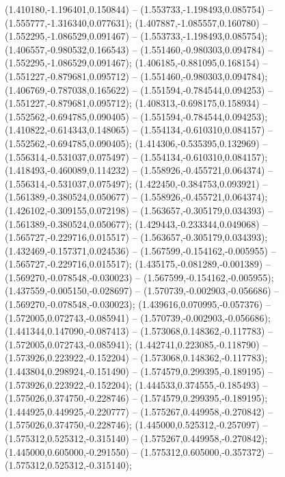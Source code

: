  (1.410180,-1.196401,0.150844) -- (1.553733,-1.198493,0.085754) -- (1.555777,-1.316340,0.077631);
 (1.407887,-1.085557,0.160780) -- (1.552295,-1.086529,0.091467) -- (1.553733,-1.198493,0.085754);
 (1.406557,-0.980532,0.166543) -- (1.551460,-0.980303,0.094784) -- (1.552295,-1.086529,0.091467);
 (1.406185,-0.881095,0.168154) -- (1.551227,-0.879681,0.095712) -- (1.551460,-0.980303,0.094784);
 (1.406769,-0.787038,0.165622) -- (1.551594,-0.784544,0.094253) -- (1.551227,-0.879681,0.095712);
 (1.408313,-0.698175,0.158934) -- (1.552562,-0.694785,0.090405) -- (1.551594,-0.784544,0.094253);
 (1.410822,-0.614343,0.148065) -- (1.554134,-0.610310,0.084157) -- (1.552562,-0.694785,0.090405);
 (1.414306,-0.535395,0.132969) -- (1.556314,-0.531037,0.075497) -- (1.554134,-0.610310,0.084157);
 (1.418493,-0.460089,0.114232) -- (1.558926,-0.455721,0.064374) -- (1.556314,-0.531037,0.075497);
 (1.422450,-0.384753,0.093921) -- (1.561389,-0.380524,0.050677) -- (1.558926,-0.455721,0.064374);
 (1.426102,-0.309155,0.072198) -- (1.563657,-0.305179,0.034393) -- (1.561389,-0.380524,0.050677);
 (1.429443,-0.233344,0.049068) -- (1.565727,-0.229716,0.015517) -- (1.563657,-0.305179,0.034393);
 (1.432469,-0.157371,0.024536) -- (1.567599,-0.154162,-0.005955) -- (1.565727,-0.229716,0.015517);
 (1.435175,-0.081289,-0.001389) -- (1.569270,-0.078548,-0.030023) -- (1.567599,-0.154162,-0.005955);
 (1.437559,-0.005150,-0.028697) -- (1.570739,-0.002903,-0.056686) -- (1.569270,-0.078548,-0.030023);
 (1.439616,0.070995,-0.057376) -- (1.572005,0.072743,-0.085941) -- (1.570739,-0.002903,-0.056686);
 (1.441344,0.147090,-0.087413) -- (1.573068,0.148362,-0.117783) -- (1.572005,0.072743,-0.085941);
 (1.442741,0.223085,-0.118790) -- (1.573926,0.223922,-0.152204) -- (1.573068,0.148362,-0.117783);
 (1.443804,0.298924,-0.151490) -- (1.574579,0.299395,-0.189195) -- (1.573926,0.223922,-0.152204);
 (1.444533,0.374555,-0.185493) -- (1.575026,0.374750,-0.228746) -- (1.574579,0.299395,-0.189195);
 (1.444925,0.449925,-0.220777) -- (1.575267,0.449958,-0.270842) -- (1.575026,0.374750,-0.228746);
 (1.445000,0.525312,-0.257097) -- (1.575312,0.525312,-0.315140) -- (1.575267,0.449958,-0.270842);
 (1.445000,0.605000,-0.291550) -- (1.575312,0.605000,-0.357372) -- (1.575312,0.525312,-0.315140);
